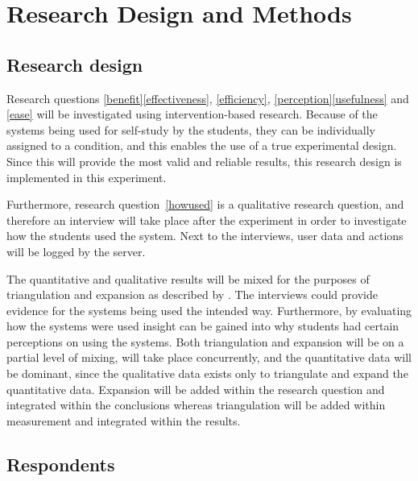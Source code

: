\chapter{Research Design and Methods}

\section{Research design}


Research questions \ref{benefit}\ref{effectiveness}, \ref{efficiency}, \ref{perception}\ref{usefulness} and \ref{ease} will be investigated using intervention-based research. Because of the systems being used for self-study by the students, they can be individually assigned to a condition, and this enables the use of a true experimental design. Since this will provide the most valid and reliable results, this research design is implemented in this experiment.

Furthermore, research question~\ref{howused} is a qualitative research question, and therefore an interview will take place after the experiment in order to investigate how the students used the system. Next to the interviews, user data and actions will be logged by the server.

The quantitative and qualitative results will be mixed for the purposes of triangulation and expansion as described by . The interviews could provide evidence for the systems being used the intended way. Furthermore, by evaluating how the systems were used insight can be gained into why students had certain perceptions on using the systems. Both triangulation and expansion will be on a partial level of mixing, will take place concurrently, and the quantitative data will be dominant, since the qualitative data exists only to triangulate and expand the quantitative data. Expansion will be added within the research question and integrated within the conclusions whereas triangulation will be added within measurement and integrated within the results. 

\section{Respondents}

